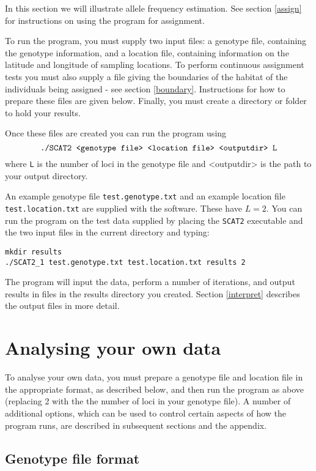 \documentclass[10pt,titlepage,times,letterpaper]{article}
\def\SCAT{{\tt SCAT2} }
\begin{document}
In this section we will illustrate allele frequency estimation.
See section \ref{assign} for
instructions on using the program for assignment.

To run the program, you must supply two input files: a genotype file,
containing the genotype information, and a location file, containing
information on the latitude and longitude of sampling locations. To
perform continuous assignment tests you must also supply a file giving the
boundaries of the habitat of the individuals being assigned - see
section \ref{boundary}.  Instructions for how to prepare these files
are given below. Finally, you must create a directory or folder to hold your results.

Once these files are created you can run the program
using
$$\text{{\tt ./SCAT2 <genotype file> <location file> <outputdir> L}}$$ 
where {\tt L} is the number of loci in the genotype file and <outputdir>
is the path to your output directory.

An example genotype file {\tt test.genotype.txt}
and an example location file {\tt test.location.txt} are supplied with
the software.  These have $L=2$.  You can run the program on the test data supplied by placing
the \SCAT executable and the two input files in the current directory and typing:

{\flushleft
\tt{mkdir results}  \\
{\tt ./SCAT2\_1 test.genotype.txt test.location.txt results 2} \\
}

\medskip

The program will input the data, perform a number of iterations, and
output results in files in the results directory you created. 
Section \ref{interpret} describes the output files in more detail.

\section{Analysing your own data}

To analyse your own data, you must prepare a genotype file and
location file in the appropriate format, as described below, and then
run the program as above (replacing 2 with the 
the number of loci in your genotype file). A number of additional options, which
can be used to control certain aspects of how the program runs, are
described in subsequent sections and the appendix.

\subsection{Genotype file format} \label{inputfile}
\end{document}

